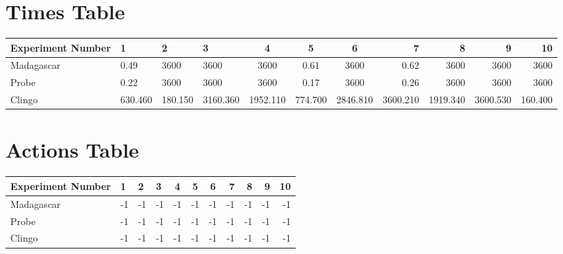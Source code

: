 \documentclass[8pt]{article}
\begin{document}
\begin{landscape}
\section{Times Table}\begin{tabular}{ | l | l | l | l | c | c | c | r | r | r | r | }\hline
Experiment Number & 1 & 2 & 3 & 4 & 5 & 6 & 7 & 8 & 9 & 10\\  \hline
Madagascar & 0.49 & 3600 & 3600 & 3600 & 0.61 & 3600 & 0.62 & 3600 & 3600 & 3600\\  \hline
Probe & 0.22 & 3600 & 3600 & 3600 & 0.17 & 3600 & 0.26 & 3600 & 3600 & 3600\\  \hline
Clingo & 630.460 & 180.150 & 3160.360 & 1952.110 & 774.700 & 2846.810 & 3600.210 & 1919.340 & 3600.530 & 160.400\\ \hline
\end{tabular}
\section{Actions Table}\begin{tabular}{ | l | l | l | l | c | c | c | r | r | r | r | }\hline
Experiment Number & 1 & 2 & 3 & 4 & 5 & 6 & 7 & 8 & 9 & 10\\ \hline
 Madagascar & -1 & -1 & -1 & -1 & -1 & -1 & -1 & -1 & -1 & -1\\ \hline
 Probe & -1 & -1 & -1 & -1 & -1 & -1 & -1 & -1 & -1 & -1\\ \hline
 Clingo & -1 & -1 & -1 & -1 & -1 & -1 & -1 & -1 & -1 & -1\\ \hline
\end{tabular}
\end{landscape}
\end{document}
